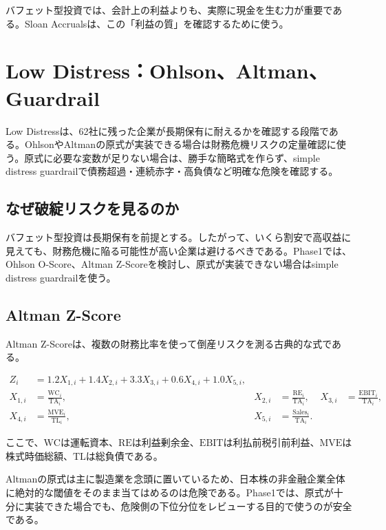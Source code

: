 \documentclass[11pt,a4paper]{article}
\newcommand{\TA}{\mathrm{TA}}
\newcommand{\TL}{\mathrm{TL}}
\newcommand{\WC}{\mathrm{WC}}
\newcommand{\RE}{\mathrm{RE}}
\newcommand{\MVE}{\mathrm{MVE}}
\begin{document}
バフェット型投資では、会計上の利益よりも、実際に現金を生む力が重要である。Sloan Accrualsは、この「利益の質」を確認するために使う。

\clearpage
\section{Low Distress：Ohlson、Altman、Guardrail}
\begin{keybox}
Low Distressは、62社に残った企業が長期保有に耐えるかを確認する段階である。OhlsonやAltmanの原式が実装できる場合は財務危機リスクの定量確認に使う。原式に必要な変数が足りない場合は、勝手な簡略式を作らず、simple distress guardrailで債務超過・連続赤字・高負債など明確な危険を確認する。
\end{keybox}

\subsection{なぜ破綻リスクを見るのか}

バフェット型投資は長期保有を前提とする。したがって、いくら割安で高収益に見えても、財務危機に陥る可能性が高い企業は避けるべきである。Phase1では、Ohlson O-Score、Altman Z-Scoreを検討し、原式が実装できない場合はsimple distress guardrailを使う。

\subsection{Altman Z-Score}

Altman Z-Scoreは、複数の財務比率を使って倒産リスクを測る古典的な式である。

\begin{align}
Z_i &= 1.2X_{1,i}+1.4X_{2,i}+3.3X_{3,i}+0.6X_{4,i}+1.0X_{5,i},
\label{eq:altman}\\
X_{1,i} &= \frac{\WC_i}{\TA_i},
& X_{2,i} &= \frac{\RE_i}{\TA_i},
& X_{3,i} &= \frac{\mathrm{EBIT}_i}{\TA_i},\nonumber\\
X_{4,i} &= \frac{\MVE_i}{\TL_i},
& X_{5,i} &= \frac{\mathrm{Sales}_i}{\TA_i}.\nonumber
\end{align}

ここで、$\WC$は運転資本、$\RE$は利益剰余金、$\mathrm{EBIT}$は利払前税引前利益、$\MVE$は株式時価総額、$\TL$は総負債である。

\begin{warnbox}[日本株への適用注意]
Altmanの原式は主に製造業を念頭に置いているため、日本株の非金融企業全体に絶対的な閾値をそのまま当てはめるのは危険である。Phase1では、原式が十分に実装できた場合でも、危険側の下位分位をレビューする目的で使うのが安全である。
\end{warnbox}
\end{document}
